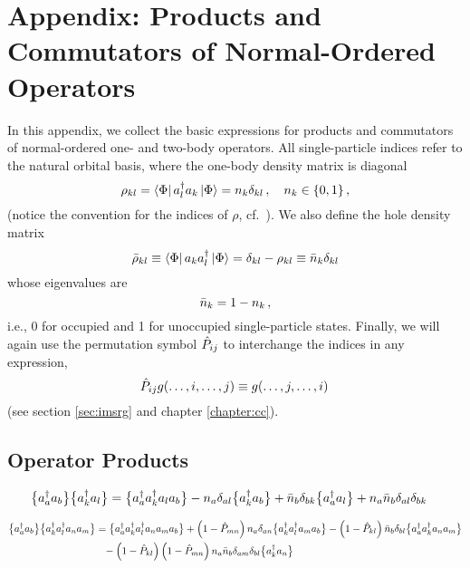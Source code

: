 \section*{\label{app:products}Appendix: Products and Commutators of Normal-Ordered Operators}
In this appendix, we collect the basic expressions for products and commutators of
normal-ordered one- and two-body operators. All single-particle indices refer to 
the natural orbital basis, where the one-body density matrix is diagonal
\begin{equation}
  \rho_{kl} = \langle{\Phi}|\,{a^\dag_{l}a_{k}}\,|{\Phi}\rangle  = n_k \delta_{kl}\,,\quad n_k\in\{0,1\}\,,
\end{equation}
(notice the convention for the indices of $\rho$, cf.~\cite{Ring:1980bb}). We also
define the hole density matrix
\begin{equation}
  \bar\rho_{kl} \equiv \langle{\Phi}|\,{a_{k}a^\dag_{l}}\,|{\Phi}\rangle  = \delta_{kl} - \rho_{kl} \equiv \bar{n}_k\delta_{kl}
\end{equation}
whose eigenvalues are 
\begin{equation}
  \bar{n}_{k}  = 1 - n_{k}\,,
\end{equation}
i.e., 0 for occupied and 1 for unoccupied single-particle states. Finally, 
we will again use the permutation symbol $\hat{P}_{ij}$ to interchange the indices 
in any expression, 
\begin{equation}\label{eq:def_Pij}
  \PO_{ij} g(\ldots,i,\ldots,j) \equiv g(\ldots,j,\ldots,i)\,
\end{equation}
(see section \ref{sec:imsrg} and chapter \ref{chapter:cc}).

\subsection*{Operator Products}
\begin{align}
  \big\{a^\dag_{a}a_{b}\big\}\big\{a^\dag_{k}a_{l}\big\}
  &=\big\{a^\dag_{a}a^\dag_{k}a_{l}a_{b}\big\}
    -n_a\delta_{al}\big\{a^\dag_{k}a_{b}\big\}
    +\bar{n}_b\delta_{bk}\big\{a^\dag_{a}a_{l}\big\}
    +n_a\bar{n}_b\delta_{al}\delta_{bk}
\end{align}



\begin{align}
  \big\{a^\dag_{a}a_{b}\big\}\big\{a^\dag_{k}a^\dag_{l}a_{n}a_{m}\big\}
  &=\big\{a^\dag_{a}a^\dag_{k}a^\dag_{l}a_{n}a_{m}a_{b}\big\}
    +\left(1-\hat{P}_{mn}\right)n_a\delta_{an}\big\{a^\dag_{k}a^\dag_{l}a_{m}a_{b}\big\}
    -\left(1-\hat{P}_{kl}\right)\bar{n}_b\delta_{bl}\big\{a^\dag_{a}a^\dag_{k}a_{n}a_{m}\big\}\notag\\
  &\hphantom{=}  
    -\left(1-\hat{P}_{kl}\right)\left(1-\hat{P}_{mn}\right)n_{a}\bar{n}_{b}\delta_{am}\delta_{bl}\big\{a^\dag_{k}a_{n}\big\}
\end{align}



